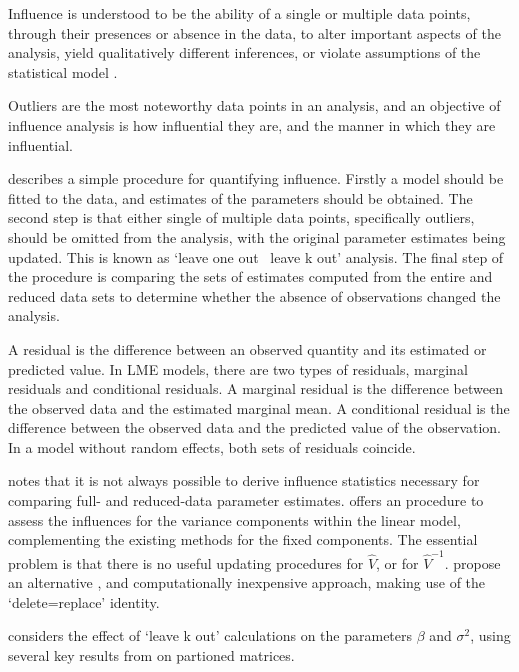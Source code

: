 \documentclass[Chap5amain.tex]{subfiles}
\begin{document}
 Influence is understood to be the ability of a single or multiple
 data points, through their presences or absence in the data, to
 alter important aspects of the analysis, yield qualitatively
 different inferences, or violate assumptions of the statistical
 model \citep{schabenberger}.
 
 Outliers are the most noteworthy data points in an analysis, and
 an objective of influence analysis is how influential they are,
 and the manner in which they are influential.
 
 \citet{schabenberger} describes a simple procedure for quantifying
 influence. Firstly a model should be fitted to the data, and
 estimates of the parameters should be obtained. The second step is
 that either single of multiple data points, specifically outliers,
 should be omitted from the analysis, with the original parameter
 estimates being updated. This is known as `leave one out \ leave k
 out' analysis. The final step of the procedure is comparing the
 sets of estimates computed from the entire and reduced data sets
 to determine whether the absence of observations changed the
 analysis.
 
 
 
 A residual is the difference between an observed quantity and its
 estimated or predicted value. In LME models, there are two types
 of residuals, marginal residuals and conditional residuals. A
 marginal residual is the difference between the observed data and
 the estimated marginal mean. A conditional residual is the
 difference between the observed data and the predicted value of
 the observation. In a model without random effects, both sets of
 residuals coincide.
 
 \citet{schabenberger} notes that it is not always possible to
 derive influence statistics necessary for comparing full- and
 reduced-data parameter estimates. \citet{HaslettDillane} offers an
 procedure to assess the influences for the variance components
 within the linear model, complementing the existing methods for
 the fixed components. The essential problem is that there is no
 useful updating procedures for $\hat{V}$, or for $\hat{V}^{-1}$.
 \citet{HaslettDillane} propose an alternative , and
 computationally inexpensive approach, making use of the
 `delete=replace' identity.
 
 \citet{Haslett99} considers the effect of `leave k out'
 calculations on the parameters $\beta$ and $\sigma^{2}$, using
 several key results from \citet{HaslettHayes} on partioned
 matrices.
 
\end{document}
